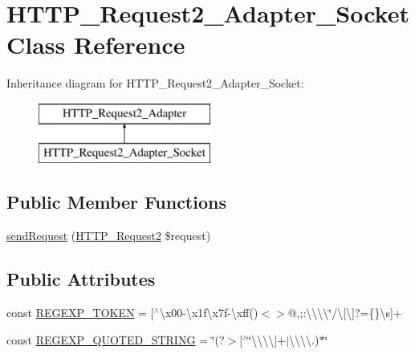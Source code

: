 \hypertarget{classHTTP__Request2__Adapter__Socket}{}\section{H\+T\+T\+P\+\_\+\+Request2\+\_\+\+Adapter\+\_\+\+Socket Class Reference}
\label{classHTTP__Request2__Adapter__Socket}
Inheritance diagram for H\+T\+T\+P\+\_\+\+Request2\+\_\+\+Adapter\+\_\+\+Socket\+:\begin{figure}[H]
\begin{center}
\leavevmode
\includegraphics[height=2.000000cm]{classHTTP__Request2__Adapter__Socket}
\end{center}
\end{figure}
\subsection*{Public Member Functions}
\begin{DoxyCompactItemize}
\item 
\hyperlink{classHTTP__Request2__Adapter__Socket_ac601f7f165d0771e38f680a1f159fe79}{send\+Request} (\hyperlink{classHTTP__Request2}{H\+T\+T\+P\+\_\+\+Request2} \$request)
\end{DoxyCompactItemize}
\subsection*{Public Attributes}
\begin{DoxyCompactItemize}
\item 
const \hyperlink{classHTTP__Request2__Adapter__Socket_a56beacc9218c6048c7f9ad5af80959eb}{R\+E\+G\+E\+X\+P\+\_\+\+T\+O\+K\+E\+N} = \textquotesingle{}\mbox{[}$^\wedge$\textbackslash{}x00-\/\textbackslash{}x1f\textbackslash{}x7f-\/\textbackslash{}xff()$<$$>$@,;\+:\textbackslash{}\textbackslash{}\textbackslash{}\textbackslash{}\char`\"{}/\textbackslash{}\mbox{[}\textbackslash{}\mbox{]}?=\{\}\textbackslash{}s\mbox{]}+\textquotesingle{}
\item 
const \hyperlink{classHTTP__Request2__Adapter__Socket_a6c107bbe3366105b84ab79ccedda35c9}{R\+E\+G\+E\+X\+P\+\_\+\+Q\+U\+O\+T\+E\+D\+\_\+\+S\+T\+R\+I\+N\+G} = \textquotesingle{}\char`\"{}(?$>$\mbox{[}$^\wedge$\char`\"{}\textbackslash{}\textbackslash{}\textbackslash{}\textbackslash{}\mbox{]}+$\vert$\textbackslash{}\textbackslash{}\textbackslash{}\textbackslash{}.)$\ast$\char`\"{}\textquotesingle{}
\end{DoxyCompactItemize}

